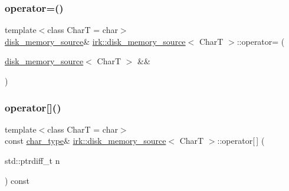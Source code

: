 \subsubsection{\texorpdfstring{operator=()}{operator=()}\hspace{0.1cm}{\footnotesize\ttfamily [2/2]}}
{\footnotesize\ttfamily template$<$class CharT  = char$>$ \\
\mbox{\hyperlink{classirk_1_1disk__memory__source}{disk\+\_\+memory\+\_\+source}}\& \mbox{\hyperlink{classirk_1_1disk__memory__source}{irk\+::disk\+\_\+memory\+\_\+source}}$<$ CharT $>$\+::operator= (\begin{DoxyParamCaption}\item[{\mbox{\hyperlink{classirk_1_1disk__memory__source}{disk\+\_\+memory\+\_\+source}}$<$ CharT $>$ \&\&}]{ }\end{DoxyParamCaption})\hspace{0.3cm}{\ttfamily [default]}}

\mbox{\label{classirk_1_1disk__memory__source_aa6d81c6ae0116c75a2ce31598b901471}} 
\subsubsection{\texorpdfstring{operator[]()}{operator[]()}}
{\footnotesize\ttfamily template$<$class CharT  = char$>$ \\
const \mbox{\hyperlink{classirk_1_1disk__memory__source_a029ab1ba55fc543025c42ee3d7320dca}{char\+\_\+type}}\& \mbox{\hyperlink{classirk_1_1disk__memory__source}{irk\+::disk\+\_\+memory\+\_\+source}}$<$ CharT $>$\+::operator\mbox{[}$\,$\mbox{]} (\begin{DoxyParamCaption}\item[{std\+::ptrdiff\+\_\+t}]{n }\end{DoxyParamCaption}) const\hspace{0.3cm}{\ttfamily [inline]}}

\mbox{\label{classirk_1_1disk__memory__source_a62bb8fd84d4e7ea1db50b0bd8c8aa355}} 

